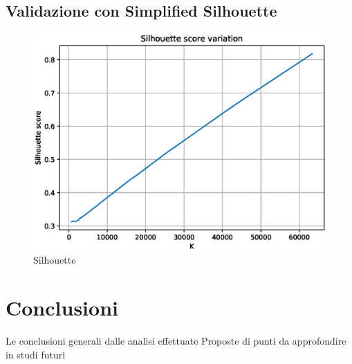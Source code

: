 \documentclass[
	11pt, %
	a4paper, %
	oneside, %
	headinclude,footinclude, %
	BCOR5mm, %
]{scrartcl}
\begin{document}
	\subsection{Validazione con Simplified Silhouette}
		\begin{figure}[!htb]
			\centering
			\includegraphics[scale=.5]{../results/silhouette.eps}
			\caption{Silhouette}
			\label{fig:silhouette}
		\end{figure}

\section{Conclusioni}
	Le conclusioni generali dalle analisi effettuate
	Proposte di punti da approfondire in studi futuri

\end{document}
